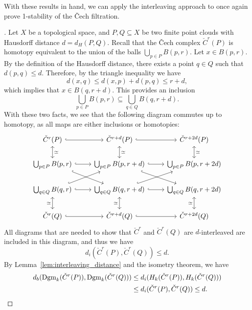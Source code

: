 With these results in hand, we can apply the interleaving approach to once again
prove 1-stability of the \v{C}ech filtration.
\begin{proof}[\cite{schnider2024introduction}]
    Let $X$ be a topological space, and $P, Q \subseteq X$ be two finite
    point clouds with Hausdorff distance $d = d_H(P, Q)$.
    Recall that the \v{C}ech complex $\check{C}^r(P)$ is homotopy equivalent
    to the union of the balls $\bigcup_{p \in P} B(p, r)$.
    Let $x \in B(p, r)$. By the definition of the Hausdorff distance, there exists
    a point $q \in Q$ such that $d(p, q) \leq d$. Therefore, by the triangle
    inequality we have
    \begin{equation}
        d(x, q) \leq d(x, p) + d(p, q) \leq r + d,
    \end{equation}
    which implies that $x \in B(q, r + d)$. This provides an inclusion
    \begin{equation}
        \bigcup_{p \in P} B(p, r) \subseteq \bigcup_{q \in Q} B(q, r + d).
    \end{equation}
    With these two facts, we see that the following diagram commutes up to
    homotopy, as all maps are either inclusions or homotopies:
    \begin{equation}
        \begin{tikzcd}
            \check{C}^r(P) \arrow[hook]{r} \arrow[leftrightarrow]{d}{\simeq}
            & \check{C}^{r + d}(P) \arrow[hook]{r} \arrow[leftrightarrow]{d}{\simeq}
            & \check{C}^{r + 2d}(P) \arrow[leftrightarrow]{d}{\simeq} \\
            \bigcup_{p \in P} B(p, r) \arrow[hook]{r} \arrow[hook]{dr}
            & \bigcup_{p \in P} B(p, r + d) \arrow[hook]{r} \arrow[hook]{dr}
            & \bigcup_{p \in P} B(p, r + 2d) \\
            \bigcup_{q \in Q} B(q, r) \arrow[hook]{r} \arrow[hook]{ur}
            & \bigcup_{q \in Q} B(q, r + d) \arrow[hook]{r} \arrow[hook]{ur}
            & \bigcup_{q \in Q} B(q, r + 2d) \\
            \check{C}^r(Q) \arrow[hook]{r} \arrow[leftrightarrow]{u}{\simeq}
            & \check{C}^{r + d}(Q) \arrow[hook]{r} \arrow[leftrightarrow]{u}{\simeq}
            & \check{C}^{r + 2d}(Q) \arrow[leftrightarrow]{u}{\simeq}
        \end{tikzcd}
    \end{equation}
    All diagrams that are needed to show that $\check{C}^r$ and $\check{C}^r(Q)$ are
    $d$-interleaved are included in this diagram, and thus we have
    \begin{equation}
        d_i(\check{C}^r(P), \check{C}^r(Q)) \leq d.
    \end{equation}
    By Lemma~\ref{lem:interleaving_distance} and the isometry theorem, we have
    \begin{align}
        d_b(\operatorname{Dgm}_k(\check{C}^r(P)), \operatorname{Dgm}_k(\check{C}^r(Q)))
        & \leq d_i(H_k(\check{C}^r(P)), H_k(\check{C}^r(Q))) \\
        & \leq d_i(\check{C}^r(P), \check{C}^r(Q)) \leq d.
    \end{align}
\end{proof}